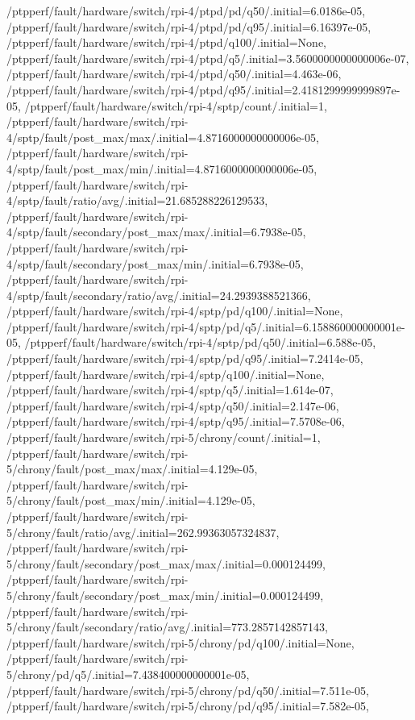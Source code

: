 {    /ptpperf/fault/hardware/switch/rpi-4/ptpd/pd/q50/.initial=6.0186e-05,
    /ptpperf/fault/hardware/switch/rpi-4/ptpd/pd/q95/.initial=6.16397e-05,
    /ptpperf/fault/hardware/switch/rpi-4/ptpd/q100/.initial=None,
    /ptpperf/fault/hardware/switch/rpi-4/ptpd/q5/.initial=3.5600000000000006e-07,
    /ptpperf/fault/hardware/switch/rpi-4/ptpd/q50/.initial=4.463e-06,
    /ptpperf/fault/hardware/switch/rpi-4/ptpd/q95/.initial=2.4181299999999897e-05,
    /ptpperf/fault/hardware/switch/rpi-4/sptp/count/.initial=1,
    /ptpperf/fault/hardware/switch/rpi-4/sptp/fault/post_max/max/.initial=4.8716000000000006e-05,
    /ptpperf/fault/hardware/switch/rpi-4/sptp/fault/post_max/min/.initial=4.8716000000000006e-05,
    /ptpperf/fault/hardware/switch/rpi-4/sptp/fault/ratio/avg/.initial=21.685288226129533,
    /ptpperf/fault/hardware/switch/rpi-4/sptp/fault/secondary/post_max/max/.initial=6.7938e-05,
    /ptpperf/fault/hardware/switch/rpi-4/sptp/fault/secondary/post_max/min/.initial=6.7938e-05,
    /ptpperf/fault/hardware/switch/rpi-4/sptp/fault/secondary/ratio/avg/.initial=24.2939388521366,
    /ptpperf/fault/hardware/switch/rpi-4/sptp/pd/q100/.initial=None,
    /ptpperf/fault/hardware/switch/rpi-4/sptp/pd/q5/.initial=6.158860000000001e-05,
    /ptpperf/fault/hardware/switch/rpi-4/sptp/pd/q50/.initial=6.588e-05,
    /ptpperf/fault/hardware/switch/rpi-4/sptp/pd/q95/.initial=7.2414e-05,
    /ptpperf/fault/hardware/switch/rpi-4/sptp/q100/.initial=None,
    /ptpperf/fault/hardware/switch/rpi-4/sptp/q5/.initial=1.614e-07,
    /ptpperf/fault/hardware/switch/rpi-4/sptp/q50/.initial=2.147e-06,
    /ptpperf/fault/hardware/switch/rpi-4/sptp/q95/.initial=7.5708e-06,
    /ptpperf/fault/hardware/switch/rpi-5/chrony/count/.initial=1,
    /ptpperf/fault/hardware/switch/rpi-5/chrony/fault/post_max/max/.initial=4.129e-05,
    /ptpperf/fault/hardware/switch/rpi-5/chrony/fault/post_max/min/.initial=4.129e-05,
    /ptpperf/fault/hardware/switch/rpi-5/chrony/fault/ratio/avg/.initial=262.99363057324837,
    /ptpperf/fault/hardware/switch/rpi-5/chrony/fault/secondary/post_max/max/.initial=0.000124499,
    /ptpperf/fault/hardware/switch/rpi-5/chrony/fault/secondary/post_max/min/.initial=0.000124499,
    /ptpperf/fault/hardware/switch/rpi-5/chrony/fault/secondary/ratio/avg/.initial=773.2857142857143,
    /ptpperf/fault/hardware/switch/rpi-5/chrony/pd/q100/.initial=None,
    /ptpperf/fault/hardware/switch/rpi-5/chrony/pd/q5/.initial=7.438400000000001e-05,
    /ptpperf/fault/hardware/switch/rpi-5/chrony/pd/q50/.initial=7.511e-05,
    /ptpperf/fault/hardware/switch/rpi-5/chrony/pd/q95/.initial=7.582e-05,
}
